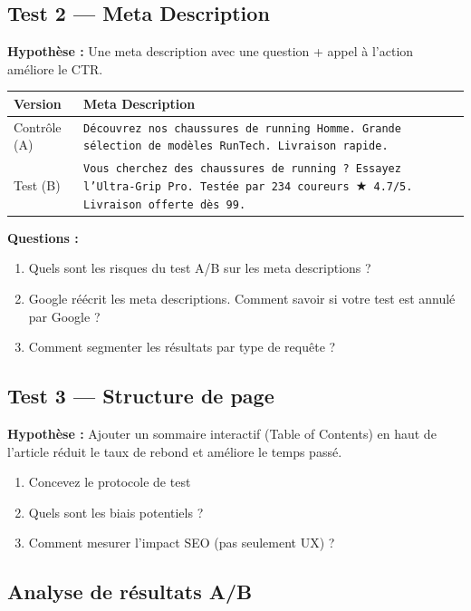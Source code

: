 \documentclass[12pt,a4paper]{report}
\begin{document}
\subsection{Test 2 --- Meta Description}

\textbf{Hypothèse :} Une meta description avec une question + appel à l'action améliore le CTR.

\begin{longtable}{|l|l|}
\hline
\textbf{Version} & \textbf{Meta Description} \\
\hline
Contrôle (A) & \texttt{Découvrez nos chaussures de running Homme. Grande sélection de modèles RunTech. Livraison rapide.} \\
\hline
Test (B) & \texttt{Vous cherchez des chaussures de running ? Essayez l'Ultra-Grip Pro. Testée par 234 coureurs $\bigstar$ 4.7/5. Livraison offerte dès 99\texteuro{}.} \\
\hline
\end{longtable}

\textbf{Questions :}
\begin{enumerate}
\item Quels sont les risques du test A/B sur les meta descriptions ?
\item Google réécrit les meta descriptions. Comment savoir si votre test est annulé par Google ?
\item Comment segmenter les résultats par type de requête ?
\end{enumerate}

\subsection{Test 3 --- Structure de page}

\textbf{Hypothèse :} Ajouter un sommaire interactif (Table of Contents) en haut de l'article réduit le taux de rebond et améliore le temps passé.

\begin{enumerate}
\item Concevez le protocole de test
\item Quels sont les biais potentiels ?
\item Comment mesurer l'impact SEO (pas seulement UX) ?
\end{enumerate}

\subsection{Analyse de résultats A/B}
\end{document}
